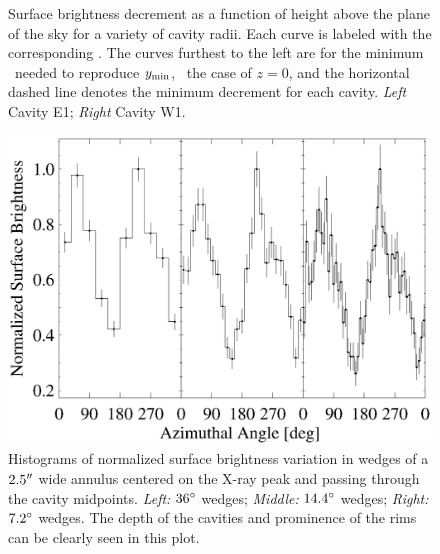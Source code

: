 \begin{figure}
\begin{center}
\begin{minipage}{0.495\linewidth}
    \end{minipage}
    \caption{Surface brightness decrement as a function of height
      above the plane of the sky for a variety of cavity radii. Each
      curve is labeled with the corresponding \rlos. The curves
      furthest to the left are for the minimum \rlos\ needed to
      reproduce $y_{\rm{min}}$, \ie\ the case of $z = 0$, and the
      horizontal dashed line denotes the minimum decrement for each
      cavity. {\it{Left}} Cavity E1; {\it{Right}} Cavity W1.}
    \label{fig:decs}
  \end{center}
\end{figure}


\begin{figure}
  \begin{center}
    \begin{minipage}{\linewidth}
      \includegraphics*[width=\textwidth, trim=15mm 5mm 5mm 10mm, clip]{pannorm.eps}
      \caption{Histograms of normalized surface brightness variation
        in wedges of a $2.5\rm{^\prime}\hskip -0.1em\rm{^\prime}$ wide annulus centered on the X-ray
        peak and passing through the cavity midpoints. {\it{Left:}}
        $36\rm{^{\circ}}$ wedges; {\it{Middle:}} $14.4\rm{^{\circ}}$ wedges;
        {\it{Right:}} $7.2\rm{^{\circ}}$ wedges. The depth of the cavities
        and prominence of the rims can be clearly seen in this plot.}
      \label{fig:pannorm}
    \end{minipage}
  \end{center}
\end{figure}

